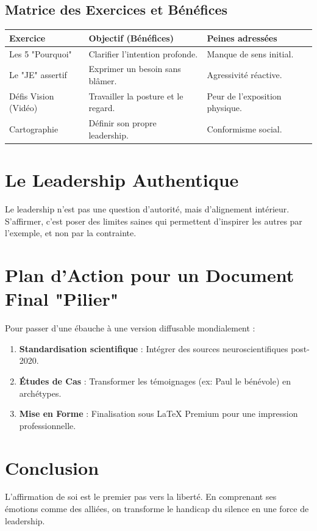 \documentclass[11.5pt,a4paper]{article}
\begin{document}
\subsection{Matrice des Exercices et Bénéfices}
\begin{center}
\begin{tabular}{|p{4cm}|p{5cm}|p{5cm}|}
\hline
\textbf{Exercice} & \textbf{Objectif (Bénéfices)} & \textbf{Peines adressées} \\
\hline
Les 5 "Pourquoi" & Clarifier l'intention profonde. & Manque de sens initial. \\
\hline
Le "JE" assertif & Exprimer un besoin sans blâmer. & Agressivité réactive. \\
\hline
Défis Vision (Vidéo) & Travailler la posture et le regard. & Peur de l'exposition physique. \\
\hline
Cartographie & Définir son propre leadership. & Conformisme social. \\
\hline
\end{tabular}
\end{center}

\section{Le Leadership Authentique}
Le leadership n'est pas une question d'autorité, mais d'alignement intérieur. S'affirmer, c'est poser des limites saines qui permettent d'inspirer les autres par l'exemple, et non par la contrainte.

\section{Plan d'Action pour un Document Final "Pilier"}
Pour passer d'une ébauche à une version diffusable mondialement :
\begin{enumerate}
    \item \textbf{Standardisation scientifique} : Intégrer des sources neuroscientifiques post-2020.
    \item \textbf{Études de Cas} : Transformer les témoignages (ex: Paul le bénévole) en archétypes.
    \item \textbf{Mise en Forme} : Finalisation sous LaTeX Premium pour une impression professionnelle.
\end{enumerate}

\section{Conclusion}
L'affirmation de soi est le premier pas vers la liberté. En comprenant ses émotions comme des alliées, on transforme le handicap du silence en une force de leadership.
\end{document}
